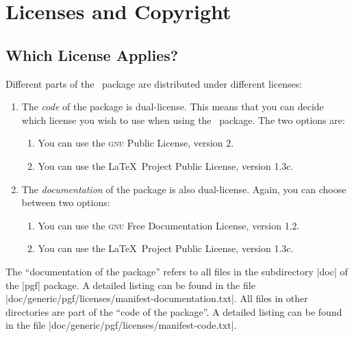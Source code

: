 %
%
%


\section{Licenses and Copyright}
\label{section-license}

\subsection{Which License Applies?}

Different parts of the \pgfname\ package are distributed under different
licenses:
%
\begin{enumerate}
    \item The \emph{code} of the package is dual-license. This means that you
        can decide which license you wish to use when using the \pgfname\
        package. The two options are:
        \begin{enumerate}
            \item You can use the \textsc{gnu} Public License, version 2.
            \item You can use the \LaTeX\ Project Public License, version
                1.3c.
        \end{enumerate}
    \item The \emph{documentation} of the package is also dual-license.
        Again, you can choose between two options:
        \begin{enumerate}
            \item You can use the \textsc{gnu} Free Documentation License,
                version 1.2.
            \item You can use the \LaTeX\ Project Public License, version
                1.3c.
        \end{enumerate}
\end{enumerate}

The ``documentation of the package'' refers to all files in the subdirectory
|doc| of the |pgf| package. A detailed listing can be found in the file
|doc/generic/pgf/licenses/manifest-documentation.txt|. All files in other
directories are part of the ``code of the package''. A detailed listing can be
found in the file |doc/generic/pgf/licenses/manifest-code.txt|.

